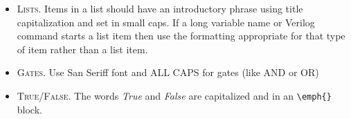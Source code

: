 \begin{itemize}
  \item \textsc{Lists}. Items in a list should have an introductory phrase using title capitalization and set in small caps. If a long variable name or Verilog command starts a list item then use the formatting appropriate for that type of item rather than a list item.
  
  \item \textsc{Gates}. Use San Seriff font and ALL CAPS for gates (like \textsf{AND} or \textsf{OR})
  
  \item \textsc{True/False}. The words \emph{True} and \emph{False} are capitalized and in an \lstinline[columns=fixed]|\emph{}| block.

\end{itemize}

